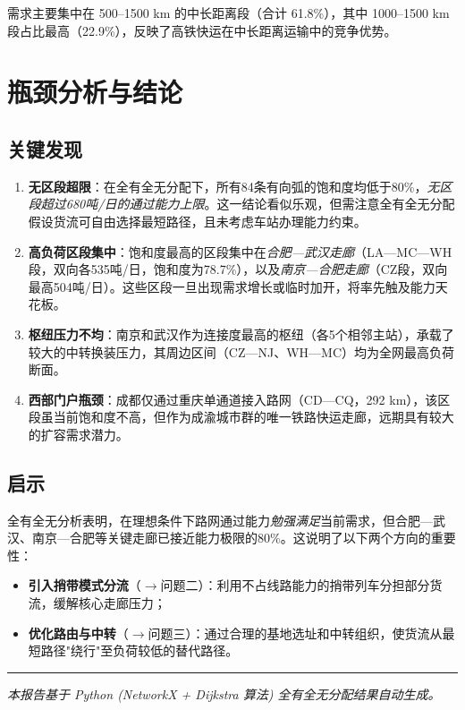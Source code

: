 \documentclass[12pt,a4paper,fontset=none]{ctexart}
\begin{document}
需求主要集中在 500--1500 km 的中长距离段（合计 61.8\%），其中 1000--1500 km 段占比最高（22.9\%），反映了高铁快运在中长距离运输中的竞争优势。

\section{瓶颈分析与结论}

\subsection{关键发现}

\begin{enumerate}[leftmargin=*]
    \item \textbf{无区段超限}：在全有全无分配下，所有84条有向弧的饱和度均低于80\%，\emph{无区段超过680吨/日的通过能力上限}。这一结论看似乐观，但需注意全有全无分配假设货流可自由选择最短路径，且未考虑车站办理能力约束。
    
    \item \textbf{高负荷区段集中}：饱和度最高的区段集中在\emph{合肥—武汉走廊}（LA—MC—WH段，双向各535吨/日，饱和度为78.7\%），以及\emph{南京—合肥走廊}（CZ段，双向最高504吨/日）。这些区段一旦出现需求增长或临时加开，将率先触及能力天花板。
    
    \item \textbf{枢纽压力不均}：南京和武汉作为连接度最高的枢纽（各5个相邻主站），承载了较大的中转换装压力，其周边区间（CZ—NJ、WH—MC）均为全网最高负荷断面。
    
    \item \textbf{西部门户瓶颈}：成都仅通过重庆单通道接入路网（CD—CQ，292 km），该区段虽当前饱和度不高，但作为成渝城市群的唯一铁路快运走廊，远期具有较大的扩容需求潜力。
\end{enumerate}

\subsection{启示}

全有全无分析表明，在理想条件下路网通过能力\emph{勉强满足}当前需求，但合肥—武汉、南京—合肥等关键走廊已接近能力极限的80\%。这说明了以下两个方向的重要性：

\begin{itemize}
    \item \textbf{引入捎带模式分流}（$\to$问题二）：利用不占线路能力的捎带列车分担部分货流，缓解核心走廊压力；
    \item \textbf{优化路由与中转}（$\to$问题三）：通过合理的基地选址和中转组织，使货流从最短路径"绕行"至负荷较低的替代路径。
\end{itemize}

\vspace{12pt}
\noindent\rule{\textwidth}{0.5pt}
\vspace{6pt}

\begin{center}
\small\textit{本报告基于 Python (NetworkX + Dijkstra 算法) 全有全无分配结果自动生成。}
\end{center}
\end{document}
